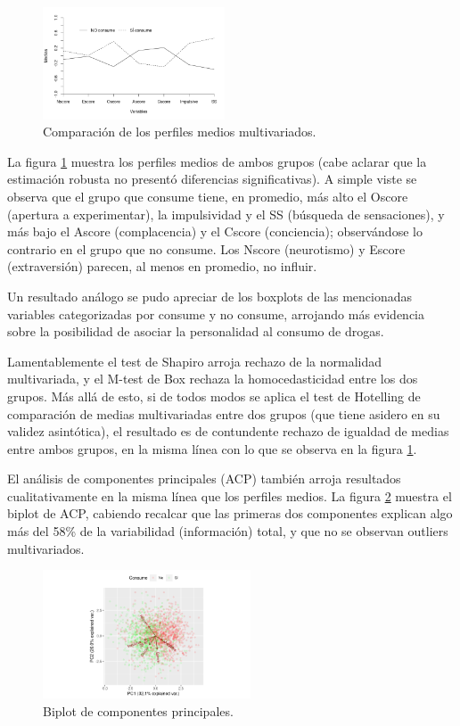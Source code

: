 \documentclass[a4paper,twocolumn]{article}
\begin{document}
\begin{figure}[h]
	\centering
	\includegraphics[trim={0.1cm 1.6cm 0.8cm 0.7cm}, clip=true, width=0.48\textwidth]{perfilesMedios.png}
	\caption{Comparación de los perfiles medios multivariados.}
	\label{fig:perfMedios}
\end{figure}

La figura \ref{fig:perfMedios} muestra los perfiles medios de ambos grupos (cabe aclarar que la estimación robusta no presentó diferencias significativas). A simple viste se observa que el grupo que consume tiene, en promedio, más alto el Oscore (apertura a experimentar), la impulsividad y el SS (búsqueda de sensaciones), y más bajo el Ascore (complacencia) y el Cscore (conciencia); observándose lo contrario en el grupo que no consume. Los Nscore (neurotismo) y Escore (extraversión) parecen, al menos en promedio, no influir.

Un resultado análogo se pudo apreciar de los boxplots de las mencionadas variables categorizadas por consume y no consume, arrojando más evidencia sobre la posibilidad de asociar la personalidad al consumo de drogas.

Lamentablemente el test de Shapiro arroja rechazo de la normalidad multivariada, y el M-test de Box rechaza la homocedasticidad entre los dos grupos. Más allá de esto, si de todos modos se aplica el test de Hotelling de comparación de medias multivariadas entre dos grupos (que tiene asidero en su validez asintótica), el resultado es de contundente rechazo de igualdad de medias entre ambos grupos, en la misma línea con lo que se observa en la figura \ref{fig:perfMedios}.

El análisis de componentes principales (ACP) también arroja resultados cualitativamente en la misma línea que los perfiles medios. La figura \ref{fig:pca} muestra el biplot de ACP, cabiendo recalcar que las primeras dos componentes explican algo más del 58\% de la variabilidad (información) total, y que no se observan outliers multivariados. 

\begin{figure}[h]
	\centering
	\includegraphics[trim={4cm 0.2cm 2cm 0.5cm}, clip=true, width=0.55\textwidth]{pca.png}
	\caption{Biplot de componentes principales.}
	\label{fig:pca}
\end{figure}
\end{document}
